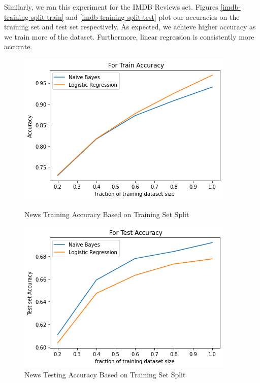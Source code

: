 \documentclass{homework}
\begin{document}
Similarly, we ran this experiment for the IMDB Reviews set. Figures \ref{imdb-training-split-train} and \ref{imdb-training-split-test} plot our accuracies on the training set and test set respectively. As expected, we achieve higher accuracy as we train more of the dataset. Furthermore, linear regression is consistently more accurate. 

\begin{figure}[h!]
  \centering
  \begin{minipage}[h]{0.3\textwidth}
    \includegraphics[width=\textwidth]{news-varying-train-set-size-train-accuracy.png}
    \caption{News Training Accuracy Based on Training Set Split }\label{news-training-split-train}
  \end{minipage}
\hpace{1.5cm}
   \begin{minipage}[h]{0.3\textwidth}
    \includegraphics[width=\textwidth]{news-varying-train-set-size-test-accuracy.png}
    \caption{News Testing Accuracy Based on Training Set Split}\label{news-training-split-test}
  \end{minipage}
\end{figure}
\end{document}
